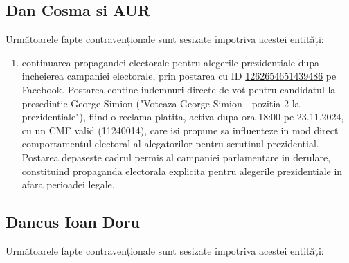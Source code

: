 \documentclass[a4paper,12pt]{article}
\begin{document}
\vspace{0.5cm}

\subsection{Dan Cosma si AUR}
Următoarele fapte contravenționale sunt sesizate împotriva acestei entități:

\begin{enumerate}[leftmargin=*, label=\arabic*.)]
    \item continuarea propagandei electorale pentru alegerile prezidentiale dupa incheierea campaniei electorale, prin postarea cu ID \href{https://www.facebook.com/ads/library/?id=1262654651439486}{1262654651439486} pe Facebook. Postarea contine indemnuri directe de vot pentru candidatul la presedintie George Simion ("Voteaza George Simion - pozitia 2 la prezidentiale"), fiind o reclama platita, activa dupa ora 18:00 pe 23.11.2024, cu un CMF valid (11240014), care isi propune sa influenteze in mod direct comportamentul electoral al alegatorilor pentru scrutinul prezidential. Postarea depaseste cadrul permis al campaniei parlamentare in derulare, constituind propaganda electorala explicita pentru alegerile prezidentiale in afara perioadei legale.
\end{enumerate}

\vspace{0.5cm}

\subsection{Dancus Ioan Doru}
Următoarele fapte contravenționale sunt sesizate împotriva acestei entități:
\end{document}
